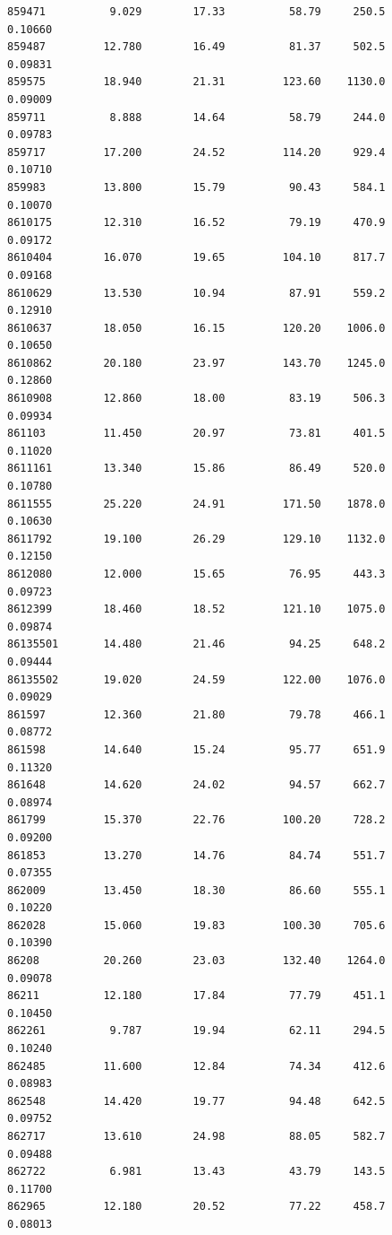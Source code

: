 \documentclass[
  letterpaper,
  DIV=11,
  numbers=noendperiod]{scrartcl}
\begin{document}
\begin{verbatim}
859471          9.029        17.33          58.79     250.5         0.10660
859487         12.780        16.49          81.37     502.5         0.09831
859575         18.940        21.31         123.60    1130.0         0.09009
859711          8.888        14.64          58.79     244.0         0.09783
859717         17.200        24.52         114.20     929.4         0.10710
859983         13.800        15.79          90.43     584.1         0.10070
8610175        12.310        16.52          79.19     470.9         0.09172
8610404        16.070        19.65         104.10     817.7         0.09168
8610629        13.530        10.94          87.91     559.2         0.12910
8610637        18.050        16.15         120.20    1006.0         0.10650
8610862        20.180        23.97         143.70    1245.0         0.12860
8610908        12.860        18.00          83.19     506.3         0.09934
861103         11.450        20.97          73.81     401.5         0.11020
8611161        13.340        15.86          86.49     520.0         0.10780
8611555        25.220        24.91         171.50    1878.0         0.10630
8611792        19.100        26.29         129.10    1132.0         0.12150
8612080        12.000        15.65          76.95     443.3         0.09723
8612399        18.460        18.52         121.10    1075.0         0.09874
86135501       14.480        21.46          94.25     648.2         0.09444
86135502       19.020        24.59         122.00    1076.0         0.09029
861597         12.360        21.80          79.78     466.1         0.08772
861598         14.640        15.24          95.77     651.9         0.11320
861648         14.620        24.02          94.57     662.7         0.08974
861799         15.370        22.76         100.20     728.2         0.09200
861853         13.270        14.76          84.74     551.7         0.07355
862009         13.450        18.30          86.60     555.1         0.10220
862028         15.060        19.83         100.30     705.6         0.10390
86208          20.260        23.03         132.40    1264.0         0.09078
86211          12.180        17.84          77.79     451.1         0.10450
862261          9.787        19.94          62.11     294.5         0.10240
862485         11.600        12.84          74.34     412.6         0.08983
862548         14.420        19.77          94.48     642.5         0.09752
862717         13.610        24.98          88.05     582.7         0.09488
862722          6.981        13.43          43.79     143.5         0.11700
862965         12.180        20.52          77.22     458.7         0.08013

\end{verbatim}
\end{document}
